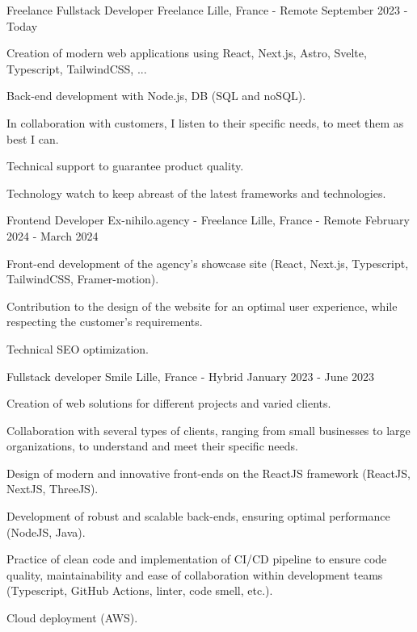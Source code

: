 
\begin{cventries}
  \cventry
    {Freelance Fullstack Developer} %
    {Freelance} %
    {Lille, France - Remote} %
    {September 2023 - Today} %
    {
      \begin{cvitems} %
        \item {Creation of modern web applications using React, Next.js, Astro, Svelte, Typescript, TailwindCSS, ...}
        \item {Back-end development with Node.js, DB (SQL and noSQL).}
        \item {In collaboration with customers, I listen to their specific needs, to meet them as best I can.}
        \item {Technical support to guarantee product quality.}
        \item {Technology watch to keep abreast of the latest frameworks and technologies.}
      \end{cvitems}
    }

  \cventry
    {Frontend Developer} %
    {Ex-nihilo.agency - Freelance} %
    {Lille, France - Remote} %
    {February 2024 - March 2024} %
    {
      \begin{cvitems} %
        \item {Front-end development of the agency's showcase site (React, Next.js, Typescript, TailwindCSS, Framer-motion).}
        \item {Contribution to the design of the website for an optimal user experience, while respecting the customer's requirements.}
        \item {Technical SEO optimization.}
      \end{cvitems}
    }

  \cventry
    {Fullstack developer} %
    {Smile} %
    {Lille, France - Hybrid} %
    {January 2023 - June 2023} %
    {
      \begin{cvitems} %
        \item {Creation of web solutions for different projects and varied clients.}
        \item {Collaboration with several types of clients, ranging from small businesses to large organizations, to understand and meet their specific needs.}
        \item {Design of modern and innovative front-ends on the ReactJS framework (ReactJS, NextJS, ThreeJS).}
        \item {Development of robust and scalable back-ends, ensuring optimal performance (NodeJS, Java).}
        \item {Practice of clean code and implementation of CI/CD pipeline to ensure code quality, maintainability and ease of collaboration within development teams (Typescript, GitHub Actions, linter, code smell, etc.).}
        \item {Cloud deployment (AWS).}
      \end{cvitems}
    }


\end{cventries}
